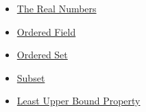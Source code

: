 \begin{dependencies}
\begin{itemize}
  \item \hyperref[def:reals]{The Real Numbers}
  \item \hyperref[def:real-ordered-field]{Ordered Field}
  \item \hyperref[def:ordered-set]{Ordered Set}
  \item \hyperref[def:subset]{Subset}
  \item \hyperref[def:least-upper-bound-property]{Least Upper Bound Property}
\end{itemize}
\end{dependencies}

